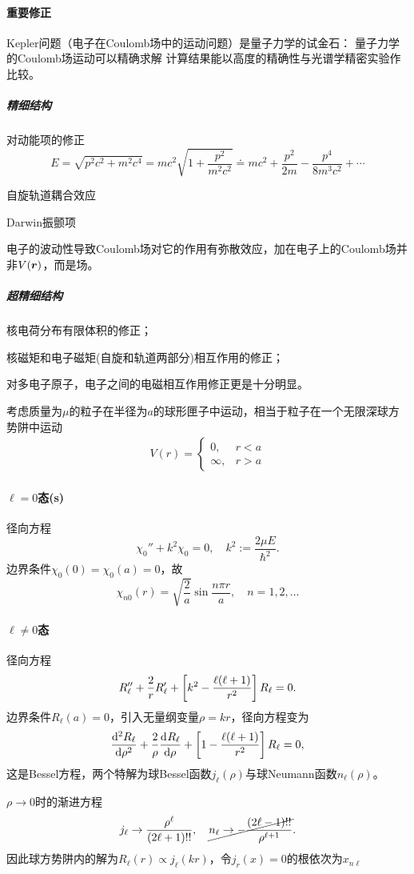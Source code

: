 \paragraph{重要修正}
Kepler问题（电子在Coulomb场中的运动问题）是量子力学的试金石：
量子力学的Coulomb场运动可以精确求解
计算结果能以高度的精确性与光谱学精密实验作比较。
\subparagraph*{精细结构}
\begin{compactenum}
	\item 对动能项的修正
	\[
		E=\sqrt{p^2c^2+m^2c^4}=mc^2\sqrt{1+\frac{p^2}{m^2c^2}}\doteq mc^2+\frac{p^2}{2m}-\frac{p^4}{8m^3c^2}+\cdots
	\]
	\item 自旋轨道耦合效应
	\item Darwin振颤项

	电子的波动性导致Coulomb场对它的作用有弥散效应，加在电子上的Coulomb场并非$V(\r)$，而是场。
\end{compactenum}
\subparagraph*{超精细结构}
\begin{compactenum}
	\item 核电荷分布有限体积的修正；
	\item 核磁矩和电子磁矩(自旋和轨道两部分)相互作用的修正；
	\item 对多电子原子，电子之间的电磁相互作用修正更是十分明显。
\end{compactenum}
考虑质量为$\mu$的粒子在半径为$a$的球形匣子中运动，相当于粒子在一个无限深球方势阱中运动
\begin{align*}
	V(r)=\begin{cases}
		0, & r<a \\[
	-1ex]\infty,&r>a
	\end{cases}
\end{align*}
\paragraph{$\ell=0$态(s)}径向方程
\[
	\chi_0''+k^2\chi_0=0,\quad k^2:=\frac{2\mu E}{\hbar^2}.
\]
边界条件$\chi_0(0)=\chi_0(a)=0$，故 
\[
	\chi_{n0}(r)=\sqrt{\frac2a}\sin\frac{n\pi r}a,\quad n=1,2,\ldots
\]
\paragraph{$\ell\neq 0$态}径向方程 
\[
	R_\ell''+\frac2rR_\ell'+\fkh{k^2-\frac{\ell(\ell+1)}{r^2}}R_\ell=0.
\]
边界条件$R_\ell(a)=0$，引入无量纲变量$\rho=kr$，径向方程变为 
\[
	\dv[2]{R_\ell}\rho+\frac2\rho\dv{R_\ell}\rho+\fkh{1-\frac{\ell(\ell+1)}{r^2}}R_\ell=0,
\]
这是Bessel方程，两个特解为球Bessel函数$j_\ell(\rho)$与球Neumann函数$n_\ell(\rho)$。

$\rho\to0$时的渐进方程
\[
	j_\ell\to\frac{\rho^\ell}{(2\ell+1)!!},\quad \cancel{n_\ell\to-\frac{(2\ell-1)!!}{\rho^{\ell+1}}}.
\]
因此球方势阱内的解为$R_\ell(r)\propto j_\ell(kr)$，令$j_r(x)=0$的根依次为$x_{n\ell}$